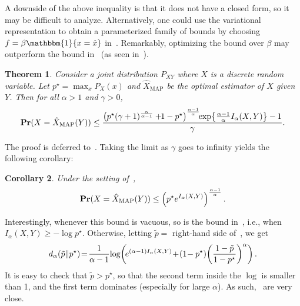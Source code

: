 \documentclass{article}
\newtheorem{theorem}{Theorem}
\numberwithin{theorem}{section}
\newtheorem{corollary}[theorem]{Corollary}
\numberwithin{example}{section}
\numberwithin{remark}{section}
\numberwithin{definition}{section}
\def\Pr{{\rm \mathbf {Pr}}}
\begin{document}
 A downside of the above inequality is that it does not have a closed form, so it may be difficult to analyze. Alternatively, one could use the variational representation to obtain a parameterized family of bounds by choosing $f = \beta \mathbbm{1} \{ x = \hat{x}\}$ in~.  Remarkably, optimizing the bound over $\beta$ may outperform the bound in~ (as seen in~). 
\begin{theorem} \label{thm:fano-like}
    Consider a joint distribution $P_{XY}$ where $X$ is a discrete random variable. Let $p^\star = \max_x P_X(x)$ and $\hat{X}_{\mathrm{MAP}}$ be the optimal estimator of $X$ given $Y$. Then for   all $\alpha >1$ and $\gamma >0$,
    \begin{align} 
         \Pr(X = \hat{X}_{\mathrm{MAP}}(Y))\leq  \frac{\left(p^\star(\gamma+1)^{\frac{\alpha}{\alpha-1}}+ \!\! 1-p^\star\right)^{\frac{\alpha-1}{\alpha}} \!\! \exp \! \left \lbrace \frac{\alpha-1}{\alpha} I_\alpha(X,Y) \right\rbrace -1 }{\gamma}.\label{eq:thm-fano-like}
        \end{align}
\end{theorem}
The proof is deferred to~. Taking the limit as $\gamma$ goes to infinity yields the following corollary:
\begin{corollary}  \label{corr:fano-like-gamma-inf}
Under the setting of~,
\begin{align} \label{eq:corr-fano-gamma-inf}
    \Pr(X = \hat{X}_{\mathrm{MAP}}(Y)) \leq  \left( p^\star e^{I_\alpha(X,Y)} \right)^{ \frac{\alpha-1}{\alpha}}.
\end{align}
\end{corollary}
Interestingly, whenever this bound is vacuous, so is the bound in~, i.e., when $I_\alpha(X,Y) \geq - \log p^\star$. Otherwise, letting $\tilde{p} =$ right-hand side of~, we get
\begin{align}
    d_\alpha(\tilde{p} \| p^\star) \! 
    = \! \frac{1}{\alpha-1} \! \log \! \left(  \! e^{(\alpha-1) I_\alpha(X,Y)} \! + \! (1 \!-p^\star) \! \left( \frac{1-\tilde{p}}{1-p^\star} \right)^{\alpha} \right). \notag
\end{align}
It is easy to check that $\tilde{p} > p^\star$, so that the second term inside the $\log$ is smaller than 1, and the first term dominates (especially for large $\alpha$). As such,~ are very close. 
\end{document}
